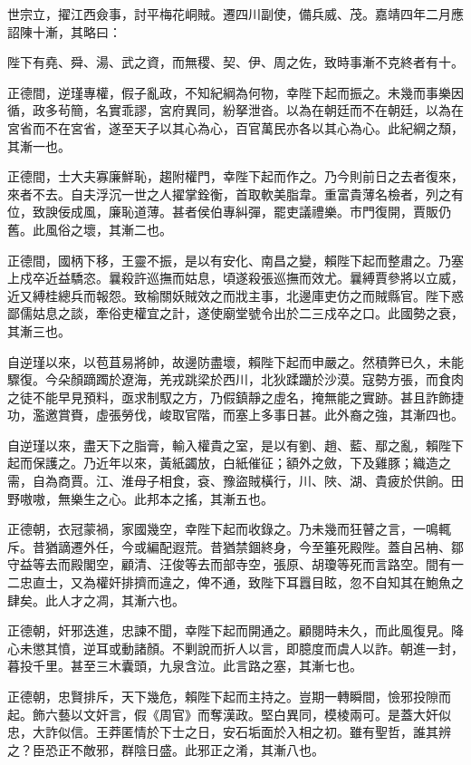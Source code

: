\begin{pinyinscope}
世宗立，擢江西僉事，討平梅花峒賊。遷四川副使，備兵威、茂。嘉靖四年二月應詔陳十漸，其略曰：

陛下有堯、舜、湯、武之資，而無稷、契、伊、周之佐，致時事漸不克終者有十。

正德間，逆瑾專權，假子亂政，不知紀綱為何物，幸陛下起而振之。未幾而事樂因循，政多茍簡，名實乖謬，宮府異同，紛拏泄沓。以為在朝廷而不在朝廷，以為在宮省而不在宮省，遂至天子以其心為心，百官萬民亦各以其心為心。此紀綱之頹，其漸一也。

正德間，士大夫寡廉鮮恥，趨附權門，幸陛下起而作之。乃今則前日之去者復來，來者不去。自夫浮沉一世之人擢掌銓衡，首取軟美脂韋。重富貴薄名檢者，列之有位，致諛佞成風，廉恥道薄。甚者侯伯專糾彈，罷吏議禮樂。市門復開，賈販仍舊。此風俗之壞，其漸二也。

正德間，國柄下移，王靈不振，是以有安化、南昌之變，賴陛下起而整肅之。乃塞上戍卒近益驕恣。曩殺許巡撫而姑息，頃遂殺張巡撫而效尤。曩縛賈參將以立威，近又縛桂總兵而報怨。致榆關妖賊效之而戕主事，北邊庫吏仿之而賊縣官。陛下惑鄙儒姑息之談，牽俗吏權宜之計，遂使廟堂號令出於二三戍卒之口。此國勢之衰，其漸三也。

自逆瑾以來，以苞苴易將帥，故邊防盡壞，賴陛下起而申嚴之。然積弊已久，未能驟復。今朵顏蹢躅於遼海，羌戎跳梁於西川，北狄蹂躪於沙漠。寇勢方張，而食肉之徒不能早見預料，亟求制馭之方，乃假鎮靜之虛名，掩無能之實跡。甚且詐飾捷功，濫邀賞賚，虛張勞伐，峻取官階，而塞上多事日甚。此外裔之強，其漸四也。

自逆瑾以來，盡天下之脂膏，輸入權貴之室，是以有劉、趙、藍、鄢之亂，賴陛下起而保護之。乃近年以來，黃紙蠲放，白紙催征；額外之斂，下及雞豚；織造之需，自為商賈。江、淮母子相食，袞、豫盜賊橫行，川、陜、湖、貴疲於供餉。田野嗷嗷，無樂生之心。此邦本之搖，其漸五也。

正德朝，衣冠蒙禍，家國幾空，幸陛下起而收錄之。乃未幾而狂瞽之言，一鳴輒斥。昔猶謫遷外任，今或編配遐荒。昔猶禁錮終身，今至箠死殿陛。蓋自呂柟、鄒守益等去而殿閣空，顧清、汪俊等去而部寺空，張原、胡瓊等死而言路空。間有一二忠直士，又為權奸排擠而違之，俾不通，致陛下耳囂目眩，忽不自知其在鮑魚之肆矣。此人才之凋，其漸六也。

正德朝，奸邪迭進，忠諫不聞，幸陛下起而開通之。顧閱時未久，而此風復見。降心未懲其憤，逆耳或動諸顏。不剿說而折人以言，即臆度而虞人以詐。朝進一封，暮投千里。甚至三木囊頭，九泉含泣。此言路之塞，其漸七也。

正德朝，忠賢排斥，天下幾危，賴陛下起而主持之。豈期一轉瞬間，憸邪投隙而起。飾六藝以文奸言，假《周官》而奪漢政。堅白異同，模棱兩可。是蓋大奸似忠，大詐似信。王莽匿情於下士之日，安石垢面於入相之初。雖有聖哲，誰其辨之？臣恐正不敵邪，群陰日盛。此邪正之淆，其漸八也。


\end{pinyinscope}
